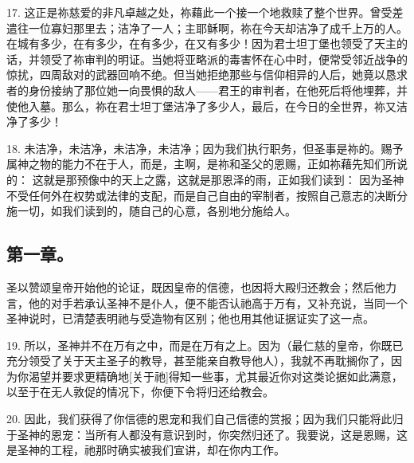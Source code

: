 17. 这正是祢慈爱的非凡卓越之处，祢藉此一个接一个地救赎了整个世界。曾受差遣往一位寡妇那里去；洁净了一人；主耶稣啊，祢在今天却洁净了成千上万的人。在城有多少，在有多少，在有多少，在又有多少！因为君士坦丁堡也领受了天主的话，并领受了祢审判的明证。当她将亚略派的毒害怀在心中时，便常受邻近战争的惊扰，四周敌对的武器回响不绝。但当她拒绝那些与信仰相异的人后，她竟以恳求者的身份接纳了那位她一向畏惧的敌人——君王的审判者，在他死后将他埋葬，并使他入墓。那么，祢在君士坦丁堡洁净了多少人，最后，在今日的全世界，祢又洁净了多少！\par

18. 未洁净，未洁净，未洁净，未洁净；因为我们执行职务，但圣事是祢的。赐予属神之物的能力不在于人，而是，主啊，是祢和圣父的恩赐，正如祢藉先知们所说的： 这就是那预像中的天上之露，这就是那恩泽的雨，正如我们读到： 因为圣神不受任何外在权势或法律的支配，而是自己自由的宰制者，按照自己意志的决断分施一切，如我们读到的，随自己的心意，各别地分施给人。\par


\subsection{第一章。}

圣以赞颂皇帝开始他的论证，既因皇帝的信德，也因将大殿归还教会；然后他力言，他的对手若承认圣神不是仆人，便不能否认祂高于万有，又补充说，当同一个圣神说时，已清楚表明祂与受造物有区别；他也用其他证据证实了这一点。\par

19. 所以，圣神并不在万有之中，而是在万有之上。因为（最仁慈的皇帝，你既已充分领受了关于天主圣子的教导，甚至能亲自教导他人），我就不再耽搁你了，因为你渴望并要求更精确地[关于祂]得知一些事，尤其最近你对这类论据如此满意，以至于在无人敦促的情况下，你便下令将归还给教会。\par

20. 因此，我们获得了你信德的恩宠和我们自己信德的赏报；因为我们只能将此归于圣神的恩宠：当所有人都没有意识到时，你突然归还了。我要说，这是恩赐，这是圣神的工程，祂那时确实被我们宣讲，却在你内工作。\par

